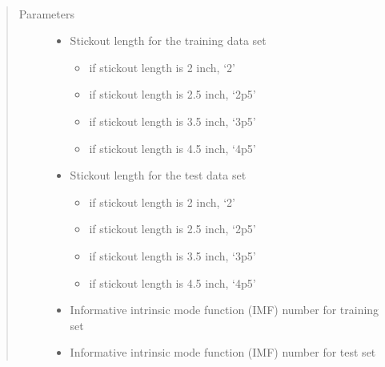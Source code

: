 \documentclass[letterpaper,10pt,english]{sphinxmanual}
\begin{document}
\begin{fulllineitems}
\label{\detokenize{EEMD:EEMD_Transfer_Learning.EEMD_Transfer_Learning}}~\begin{quote}\begin{description}
\item[{Parameters}] \leavevmode\begin{itemize}
\item {} 
 \textendash{} 
Stickout length for the training data set
\begin{itemize}
\item {} 
if stickout length is 2 inch, ‘2’

\item {} 
if stickout length is 2.5 inch, ‘2p5’

\item {} 
if stickout length is 3.5 inch, ‘3p5’

\item {} 
if stickout length is 4.5 inch, ‘4p5’

\end{itemize}


\item {} 
 \textendash{} 
Stickout length for the test data set
\begin{itemize}
\item {} 
if stickout length is 2 inch, ‘2’

\item {} 
if stickout length is 2.5 inch, ‘2p5’

\item {} 
if stickout length is 3.5 inch, ‘3p5’

\item {} 
if stickout length is 4.5 inch, ‘4p5’

\end{itemize}


\item {} 
 \textendash{} Informative intrinsic mode function (IMF) number for training set

\item {} 
 \textendash{} Informative intrinsic mode function (IMF) number for test set


\end{itemize}
\end{description}
\end{quote}
\end{fulllineitems}
\end{document}

